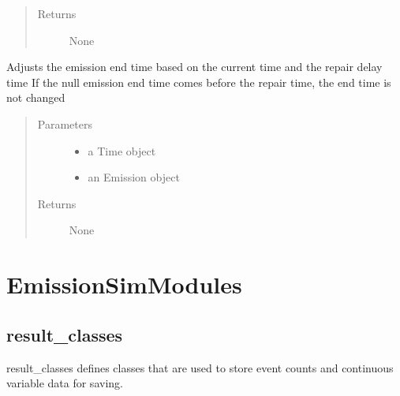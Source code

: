 \documentclass[letterpaper,10pt,english]{sphinxmanual}
\begin{document}
\begin{fulllineitems}
\begin{fulllineitems}
\begin{quote}
\begin{description}
\item[{Returns}] \leavevmode
None

\end{description}\end{quote}

\end{fulllineitems}


\begin{fulllineitems}
\label{\detokenize{index:feast.DetectionModules.repair.Repair.repair}}
Adjusts the emission end time based on the current time and the repair delay time
If the null emission end time comes before the repair time, the end time is not changed
\begin{quote}\begin{description}
\item[{Parameters}] \leavevmode\begin{itemize}
\item {} 
 \textendash{} a Time object

\item {} 
 \textendash{} an Emission object

\end{itemize}

\item[{Returns}] \leavevmode
None

\end{description}\end{quote}

\end{fulllineitems}


\end{fulllineitems}



\section{EmissionSimModules}
\label{\detokenize{index:emissionsimmodules}}

\subsection{result\_classes}
\label{\detokenize{index:module-feast.EmissionSimModules.result_classes}}\label{\detokenize{index:result-classes}}
result\_classes defines classes that are used to store event counts and continuous variable data for saving.
\end{document}
